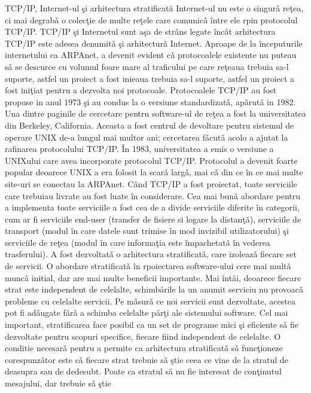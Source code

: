 \documentclass[runningheads]{llncs}
\begin{document}
TCP/IP, Internet-ul şi arhitectura stratificată
 Internet-ul nu este o singurǎ reţea, ci mai degrabǎ o colecţie de multe reţele care
comunicǎ între ele rpin protocolul TCP/IP. TCP/IP şi Internetul sunt aşa de strâns legate
încât arhitectura TCP/IP este adesea denumitǎ şi arhitecturǎ Internet. Aproape de la
începuturile internetului ca ARPAnet, a devenit evident cǎ protocoalele existente nu
puteau sǎ se descurce cu volumul foare mare al traficului pe care reţeaua trebuia sa-l
suporte, astfel un proiect a fost inieaua trebuia sa-l suporte, astfel un proiect a fost iniţiat
pentru a dezvolta noi protocoale.
 Protocoalele TCP/IP au fost propuse in anul 1973 şi au condus la o versiune
standardizatǎ, apǎrutǎ in 1982. Una dintre paginile de cercetare pentru software-ul de
reţea a fost la universitatea din Berkeley, California. Aceasta a fost centrul de devoltare
pentru sistemul de operare UNIX de-a lungul mai multor ani; cercetarea fǎcutǎ acolo a
ajutat la rafinarea protocolului TCP/IP. În 1983, universitatea a emis o versiune a UNIXului care avea incorporate protocolul TCP/IP. Protocolul a devenit foarte popular
deoarece UNIX a era folosit la scarǎ largǎ, mai cǎ din ce în ce mai multe site-uri se
conectau la ARPAnet.
 Când TCP/IP a fost proiectat, toate serviciile care trebuiau livrate au fost luate în
considerare. Cea mai bunǎ abordare pentru a implementa toate serviciile a fost cea de a
divide serviciile diferite în categorii, cum ar fi serviciile end-user (transfer de fisiere si
logare la distanţǎ), serviciile de transport (modul în care datele sunt trimise în mod
invizibil utilizatorului) şi serviciile de reţea (modul în care informaţia este împachetatǎ în
vederea trasferului). A fost dezvoltatǎ o arhitectura stratificatǎ, care izoleazǎ fiecare set
de servicii.
 O abordare stratificatǎ în rpoiectarea software-ului cere mai multǎ muncǎ initial,
dar are mai multe beneficii importante. Mai întâi, deoarece fiecare strat este independent
de celelalte, schimbǎrile la un anumit serviciu nu provoacǎ probleme cu celelalte servicii.
Pe mǎsurǎ ce noi servicii sunt dezvoltate, acestea pot fi adǎugate fǎrǎ a schimba celelalte
pǎrţi ale sistemului software. Cel mai important, stratificarea face posibil ca un set de
programe mici şi eficiente sǎ fie dezvoltate pentru scopuri specifice, fiecare fiind
independent de celelalte.
 O conditie necesarǎ pentru a permite ca arhitectura stratificatǎ sǎ funcţioneze
corespunzǎtor este cǎ fiecare strat trebuie sǎ ştie ceea ce vine de la stratul de deasupra sau
de dedesubt. Poate ca stratul sǎ nu fie interesat de conţinutul mesajului, dar trebuie sǎ ştie
\end{document}
